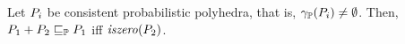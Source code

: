 %
%
%
%
%
%

\begin{lemma}\label{lem:pp:while:order} Let $ P_{i} $ be consistent
probabilistic polyhedra, that is, $ \gamma_{\mathbb{P}}(P_{i}) \neq \emptyset $.
\label{lem:pp:while:order:pluszero} Then, $ P_{1} + P_{2} \sqsubseteq_{\mathbb{P}} P_{1} $ iff $ \mathit{iszero}(P_{2}) $.
\end{lemma}

